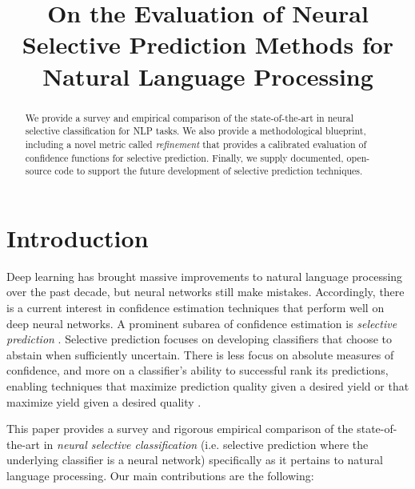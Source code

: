\documentclass[11pt]{article}
\title{On the Evaluation of Neural Selective Prediction Methods for Natural Language Processing}
\begin{document}
\maketitle
\begin{abstract}
We provide a survey and empirical comparison of the state-of-the-art in neural selective classification for NLP tasks. We also provide a methodological blueprint, including a novel metric called \emph{refinement} that provides a calibrated evaluation of confidence functions for selective prediction. Finally, we supply documented, open-source code to support the future development of selective prediction techniques. 
\end{abstract}

\section{Introduction}

Deep learning has brought massive improvements to natural language processing over the past decade, but neural networks still make mistakes. Accordingly, there is a current interest in confidence estimation techniques that perform well on deep neural networks. A prominent subarea of confidence estimation is \emph{selective prediction} \cite{el2010foundations,geifman2017selective}. Selective prediction focuses on developing classifiers that choose to abstain when sufficiently uncertain. There is less focus on absolute measures of confidence, and more on a classifier's ability to successful rank its predictions, enabling techniques that maximize prediction quality given a desired yield \cite{geifman2019selectivenet} or that maximize yield given a desired quality \cite{geifman2017selective}.  


This paper provides a survey and rigorous empirical comparison of the state-of-the-art in \emph{neural selective classification} (i.e. selective prediction where the underlying classifier is a neural network) specifically as it pertains to natural language processing. Our main contributions are the following:
\end{document}
